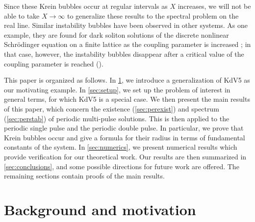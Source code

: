 \documentclass[10pt,reqno]{amsart}
\theoremstyle{plain}
\theoremstyle{definition}
\theoremstyle{remark}
\numberwithin{theorem}{section}
\numberwithin{equation}{section}
\begin{document}
Since these Krein bubbles occur at regular intervals as $X$ increases, we will not be able to take $X \rightarrow \infty$ to generalize these results to the spectral problem on the real line. Similar instability bubbles have been observed in other systems. As one example, they are found for dark soliton solutions of the discrete nonlinear Schr{\"o}dinger equation on a finite lattice as the coupling parameter is increased \cite{Johansson1999}; in that case, however, the instability bubbles disappear after a critical value of the coupling parameter is reached (\cite[Figure 2]{Johansson1999}).

This paper is organized as follows. In \cref{sec:KdV5}, we introduce a generalization of KdV5 as our motivating example. In \cref{sec:setup}, we set up the problem of interest in general terms, for which KdV5 is a special case. We then present the main results of this paper, which concern the existence (\cref{sec:perexist}) and spectrum (\cref{sec:perstab}) of periodic multi-pulse solutions. This is then applied to the periodic single pulse and the periodic double pulse. In particular, we prove that Krein bubbles occur and give a formula for their radius in terms of fundamental constants of the system. In \cref{sec:numerics}, we present numerical results which provide verification for our theoretical work. Our results are then summarized in \cref{sec:conclusions}, and some possible directions for future work are offered. The remaining sections contain proofs of the main results.

\section{Background and motivation}\label{sec:KdV5}
\end{document}
